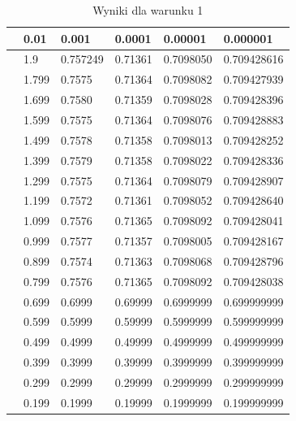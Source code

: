\documentclass{article}
\begin{document}
\begin{table}[H]
\centering
\begin{tabular}{|l|l|l|l|l|l|}
\hline
& 0.01 & 0.001 & 0.0001 & 0.00001 & 0.000001 \\ \hline
[0.10, 1.90] & 1.9 & 0.757249 & 0.71361 & 0.7098050 & 0.709428616 \\ \hline
[0.10, 1.80] & 1.799 & 0.7575 & 0.71364 & 0.7098082 & 0.709427939 \\ \hline
[0.10, 1.70] & 1.699 & 0.7580 & 0.71359 & 0.7098028 & 0.709428396 \\ \hline
[0.10, 1.60] & 1.599 & 0.7575 & 0.71364 & 0.7098076 & 0.709428883 \\ \hline
[0.10, 1.50] & 1.499 & 0.7578 & 0.71358 & 0.7098013 & 0.709428252 \\ \hline
[0.10, 1.40] & 1.399 & 0.7579 & 0.71358 & 0.7098022 & 0.709428336 \\ \hline
[0.10, 1.30] & 1.299 & 0.7575 & 0.71364 & 0.7098079 & 0.709428907 \\ \hline
[0.10, 1.20] & 1.199 & 0.7572 & 0.71361 & 0.7098052 & 0.709428640 \\ \hline
[0.10, 1.10] & 1.099 & 0.7576 & 0.71365 & 0.7098092 & 0.709428041 \\ \hline
[0.10, 1.00] & 0.999 & 0.7577 & 0.71357 & 0.7098005 & 0.709428167 \\ \hline
[0.10, 0.90] & 0.899 & 0.7574 & 0.71363 & 0.7098068 & 0.709428796 \\ \hline
[0.10, 0.80] & 0.799 & 0.7576 & 0.71365 & 0.7098092 & 0.709428038 \\ \hline
[0.10, 0.70] & 0.699 & 0.6999 & 0.69999 & 0.6999999 & 0.699999999 \\ \hline
[0.10, 0.60] & 0.599 & 0.5999 & 0.59999 & 0.5999999 & 0.599999999 \\ \hline
[0.10, 0.50] & 0.499 & 0.4999 & 0.49999 & 0.4999999 & 0.499999999 \\ \hline
[0.10, 0.40] & 0.399 & 0.3999 & 0.39999 & 0.3999999 & 0.399999999 \\ \hline
[0.10, 0.30] & 0.299 & 0.2999 & 0.29999 & 0.2999999 & 0.299999999 \\ \hline
[0.10, 0.20] & 0.199 & 0.1999 & 0.19999 & 0.1999999 & 0.199999999 \\ \hline
\end{tabular}
\caption{Wyniki dla warunku 1}
\end{table}
\end{document}
